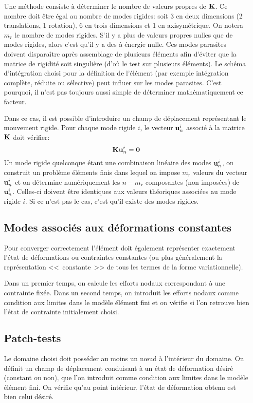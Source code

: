 \medskip
Une méthode consiste à déterminer le nombre de valeurs propres  de $\mathbf{K}$.
Ce nombre doit être égal au nombre de modes rigides: soit 3 en deux dimensions (2 translations, 1 rotation),
6 en trois dimensions et 1 en axisymétrique. On notera $m_r$ le nombre de modes rigides.
S'il y a plus de valeurs propres nulles que de modes rigides, alors c'est qu'il y a des
 à énergie nulle.
Ces modes parasites doivent disparaître après assemblage de plusieurs éléments
afin d'éviter que la matrice de rigidité soit singulière (d'où le test sur plusieurs éléments).
Le schéma d'intégration choisi pour la définition de l'élément (par exemple intégration
complète, réduite ou sélective) peut influer sur les modes parasites.
C'est pourquoi, il n'est pas toujours aussi simple de déterminer mathématiquement
ce facteur.

\medskip
Dans ce cas, il est possible d'introduire un champ de déplacement représentant le
mouvement rigide.
Pour chaque mode rigide $i$, le vecteur $\mathbf{u}^i_n$ associé à la matrice $\mathbf{K}$ doit
vérifier:
\begin{equation}\mathbf{K}\mathbf{u}^i_n=\mathbf{0}\end{equation}
Un mode rigide quelconque étant une combinaison linéaire des modes $\mathbf{u}^i_n$,
on construit un problème éléments finis dans lequel on impose $m_r$ valeurs du vecteur $\mathbf{u}^i_n$
et on détermine numériquement les $n-m_r$ composantes (non imposées) de $\mathbf{u}^i_n$.
Celles-ci doivent être identiques aux valeurs théoriques associées au mode
rigide $i$. Si ce n'est pas le cas, c'est qu'il existe des modes rigides.
\medskip
\subsection{Modes associés aux déformations constantes}
Pour converger correctement l'élément doit également représenter
exactement l'état de déformations ou contraintes constantes (ou plus
généralement la représentation <<~constante~>> de tous les termes de la
forme variationnelle).

Dans un premier temps, on calcule les efforts nodaux correspondant à une contrainte fixée.
Dans un second temps, on introduit les efforts nodaux comme condition aux limites dans le modèle
élément fini et on vérifie si l'on retrouve bien l'état de contrainte initialement choisi.

\medskip
\subsection{Patch-tests}
Le domaine choisi doit posséder au moins un nœud à l'intérieur du domaine.
On définit un champ de déplacement conduisant à un état de déformation
désiré (constant ou non), que l'on introduit comme condition aux limites dans le modèle élément fini.
On vérifie qu'au point intérieur, l'état de déformation obtenu est bien celui
désiré.

